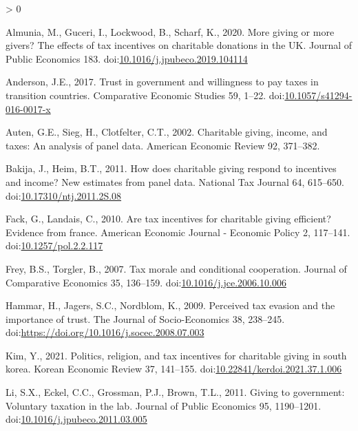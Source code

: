 \documentclass[
]{article}
\newlength{\cslhangindent}
\newenvironment{CSLReferences}[2] %
 {%
  \setlength{\parindent}{0pt}
  \ifodd #1 \everypar{\setlength{\hangindent}{\cslhangindent}}\ignorespaces\fi
  \ifnum #2 > 0
  \setlength{\parskip}{#2\baselineskip}
  \fi
 }%
 {}
\begin{document}
\hypertarget{refs}{}
\begin{CSLReferences}{1}{0}
\leavevmode\hypertarget{ref-Almunia2020}{}%
Almunia, M., Guceri, I., Lockwood, B., Scharf, K., 2020. More giving or more givers? The effects of tax incentives on charitable donations in the UK. Journal of Public Economics 183. doi:\href{https://doi.org/10.1016/j.jpubeco.2019.104114}{10.1016/j.jpubeco.2019.104114}

\leavevmode\hypertarget{ref-Anderson2017}{}%
Anderson, J.E., 2017. Trust in government and willingness to pay taxes in transition countries. Comparative Economic Studies 59, 1--22. doi:\href{https://doi.org/10.1057/s41294-016-0017-x}{10.1057/s41294-016-0017-x}

\leavevmode\hypertarget{ref-Auten2002}{}%
Auten, G.E., Sieg, H., Clotfelter, C.T., 2002. Charitable giving, income, and taxes: An analysis of panel data. American Economic Review 92, 371--382.

\leavevmode\hypertarget{ref-Bakija2011}{}%
Bakija, J., Heim, B.T., 2011. How does charitable giving respond to incentives and income? New estimates from panel data. National Tax Journal 64, 615--650. doi:\href{https://doi.org/10.17310/ntj.2011.2S.08}{10.17310/ntj.2011.2S.08}

\leavevmode\hypertarget{ref-Fack2010}{}%
Fack, G., Landais, C., 2010. Are tax incentives for charitable giving efficient? Evidence from france. American Economic Journal - Economic Policy 2, 117--141. doi:\href{https://doi.org/10.1257/pol.2.2.117}{10.1257/pol.2.2.117}

\leavevmode\hypertarget{ref-Frey2007}{}%
Frey, B.S., Torgler, B., 2007. Tax morale and conditional cooperation. Journal of Comparative Economics 35, 136--159. doi:\href{https://doi.org/10.1016/j.jce.2006.10.006}{10.1016/j.jce.2006.10.006}

\leavevmode\hypertarget{ref-Hammar2009}{}%
Hammar, H., Jagers, S.C., Nordblom, K., 2009. Perceived tax evasion and the importance of trust. The Journal of Socio-Economics 38, 238--245. doi:\url{https://doi.org/10.1016/j.socec.2008.07.003}

\leavevmode\hypertarget{ref-Kim2021}{}%
Kim, Y., 2021. Politics, religion, and tax incentives for charitable giving in south korea. Korean Economic Review 37, 141--155. doi:\href{https://doi.org/10.22841/kerdoi.2021.37.1.006}{10.22841/kerdoi.2021.37.1.006}

\leavevmode\hypertarget{ref-Li2011}{}%
Li, S.X., Eckel, C.C., Grossman, P.J., Brown, T.L., 2011. Giving to government: Voluntary taxation in the lab. Journal of Public Economics 95, 1190--1201. doi:\href{https://doi.org/10.1016/j.jpubeco.2011.03.005}{10.1016/j.jpubeco.2011.03.005}


\end{CSLReferences}
\end{document}
